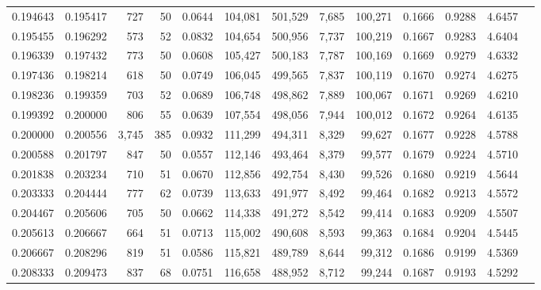 \begin{tabular}{rrrrrrrrrrrrr}
0.194643 & 0.195417 &    727 &    50 &                                     0.0644 & 104,081 & 501,529 &   7,685 & 100,271 & 0.1666 & 0.9288 & 4.6457 \\
0.195455 & 0.196292 &    573 &    52 &                                     0.0832 & 104,654 & 500,956 &   7,737 & 100,219 & 0.1667 & 0.9283 & 4.6404 \\
0.196339 & 0.197432 &    773 &    50 &                                     0.0608 & 105,427 & 500,183 &   7,787 & 100,169 & 0.1669 & 0.9279 & 4.6332 \\
0.197436 & 0.198214 &    618 &    50 &                                     0.0749 & 106,045 & 499,565 &   7,837 & 100,119 & 0.1670 & 0.9274 & 4.6275 \\
0.198236 & 0.199359 &    703 &    52 &                                     0.0689 & 106,748 & 498,862 &   7,889 & 100,067 & 0.1671 & 0.9269 & 4.6210 \\
0.199392 & 0.200000 &    806 &    55 &                                     0.0639 & 107,554 & 498,056 &   7,944 & 100,012 & 0.1672 & 0.9264 & 4.6135 \\
0.200000 & 0.200556 &  3,745 &   385 &                                     0.0932 & 111,299 & 494,311 &   8,329 &  99,627 & 0.1677 & 0.9228 & 4.5788 \\
0.200588 & 0.201797 &    847 &    50 &                                     0.0557 & 112,146 & 493,464 &   8,379 &  99,577 & 0.1679 & 0.9224 & 4.5710 \\
0.201838 & 0.203234 &    710 &    51 &                                     0.0670 & 112,856 & 492,754 &   8,430 &  99,526 & 0.1680 & 0.9219 & 4.5644 \\
0.203333 & 0.204444 &    777 &    62 &                                     0.0739 & 113,633 & 491,977 &   8,492 &  99,464 & 0.1682 & 0.9213 & 4.5572 \\
0.204467 & 0.205606 &    705 &    50 &                                     0.0662 & 114,338 & 491,272 &   8,542 &  99,414 & 0.1683 & 0.9209 & 4.5507 \\
0.205613 & 0.206667 &    664 &    51 &                                     0.0713 & 115,002 & 490,608 &   8,593 &  99,363 & 0.1684 & 0.9204 & 4.5445 \\
0.206667 & 0.208296 &    819 &    51 &                                     0.0586 & 115,821 & 489,789 &   8,644 &  99,312 & 0.1686 & 0.9199 & 4.5369 \\
0.208333 & 0.209473 &    837 &    68 &                                     0.0751 & 116,658 & 488,952 &   8,712 &  99,244 & 0.1687 & 0.9193 & 4.5292 \\

\end{tabular}
